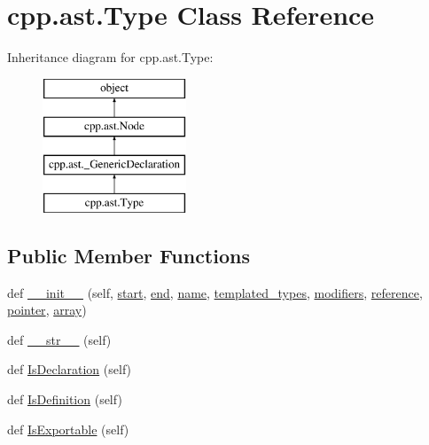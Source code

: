 \hypertarget{classcpp_1_1ast_1_1_type}{}\section{cpp.\+ast.\+Type Class Reference}
\label{classcpp_1_1ast_1_1_type}
Inheritance diagram for cpp.\+ast.\+Type\+:\begin{figure}[H]
\begin{center}
\leavevmode
\includegraphics[height=4.000000cm]{d1/d2b/classcpp_1_1ast_1_1_type}
\end{center}
\end{figure}
\subsection*{Public Member Functions}
\begin{DoxyCompactItemize}
\item 
def \mbox{\hyperlink{classcpp_1_1ast_1_1_type_adc20d88db721b5d7b513c08a4d6753c9}{\+\_\+\+\_\+init\+\_\+\+\_\+}} (self, \mbox{\hyperlink{classcpp_1_1ast_1_1_node_a7b2aa97e6a049bb1a93aea48c48f1f44}{start}}, \mbox{\hyperlink{classcpp_1_1ast_1_1_node_a3c5e5246ccf619df28eca02e29d69647}{end}}, \mbox{\hyperlink{classcpp_1_1ast_1_1_type_a5905424e2b65f0215b6ecd73b4bfe24c}{name}}, \mbox{\hyperlink{classcpp_1_1ast_1_1_type_a7c38fcafa00dae6ee22bab783086a1a7}{templated\+\_\+types}}, \mbox{\hyperlink{classcpp_1_1ast_1_1_type_a0effa0a077eda79943e881955b4c51a5}{modifiers}}, \mbox{\hyperlink{classcpp_1_1ast_1_1_type_a8d2cddd631397c3bf86198cc420d584d}{reference}}, \mbox{\hyperlink{classcpp_1_1ast_1_1_type_a37234bb68915c93894cbc8e366c1eaad}{pointer}}, \mbox{\hyperlink{classcpp_1_1ast_1_1_type_a1fd0493e82da315bcb4c02b0cf2133a3}{array}})
\item 
def \mbox{\hyperlink{classcpp_1_1ast_1_1_type_a1a10eff21f6150b7e14bde3788fa069b}{\+\_\+\+\_\+str\+\_\+\+\_\+}} (self)
\item 
def \mbox{\hyperlink{classcpp_1_1ast_1_1_type_a590071a2bce7ea5140d7eb86c90f63bf}{Is\+Declaration}} (self)
\item 
def \mbox{\hyperlink{classcpp_1_1ast_1_1_type_aedff25dc3736e83388742e55fe29159b}{Is\+Definition}} (self)
\item 
def \mbox{\hyperlink{classcpp_1_1ast_1_1_type_a80dce781581c03e550ce51a9a33ca158}{Is\+Exportable}} (self)
\end{DoxyCompactItemize}
